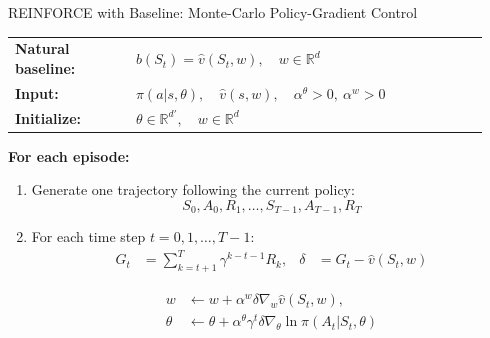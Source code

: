 \documentclass{beamer}
\begin{document}
\begin{frame}{REINFORCE with Baseline: Monte-Carlo Policy-Gradient Control}

\scriptsize

\begin{tabular}{@{}p{0.24\linewidth}p{0.70\linewidth}@{}}
\textbf{Natural baseline:}
&
\(b(S_t)=\hat{v}(S_t,w),\quad w\in\mathbb{R}^{d}\)
\\[0.08cm]
\textbf{Input:}
&
\(\pi(a|s,\theta),\quad \hat{v}(s,w),\quad
\alpha^\theta>0,\ \alpha^w>0\)
\\[0.08cm]
\textbf{Initialize:}
&
\(\theta\in\mathbb{R}^{d'},\quad w\in\mathbb{R}^{d}\)
\end{tabular}

\vspace{0.12cm}

\textbf{For each episode:}
\begin{enumerate}
    \item Generate one trajectory following the current policy:
    \[
    S_0, A_0, R_1, \ldots, S_{T-1}, A_{T-1}, R_T
    \]

    \item For each time step \(t=0,1,\ldots,T-1\):
    \[
    \begin{aligned}
    G_t
    &=
    \sum_{k=t+1}^{T}
    \gamma^{k-t-1} R_k,
    &
    \delta
    &=
    G_t - \hat{v}(S_t,w)
    \end{aligned}
    \]

    \[
    \begin{aligned}
    w
    &\leftarrow
    w
    +
    \alpha^w \delta
    \nabla_w \hat{v}(S_t,w),
    \\
    \theta
    &\leftarrow
    \theta
    +
    \alpha^\theta \gamma^t \delta
    \nabla_\theta \ln \pi(A_t|S_t,\theta)
    \end{aligned}
    \]
\end{enumerate}

\end{frame}
\end{document}
